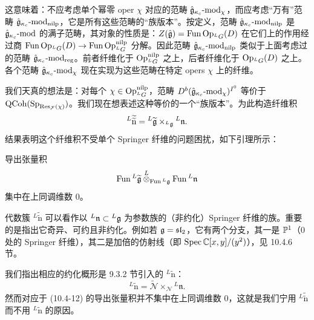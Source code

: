 这意味着：不应考虑单个幂零 oper $\chi$ 对应的范畴 $\hat{\mathfrak{g}}_{\kappa_c}\text{-}\mathrm{mod}_\chi$，而应考虑“万有”范畴 $\hat{\mathfrak{g}}_{\kappa_c}\text{-}\mathrm{mod}_{\mathrm{nilp}}$，它是所有这些范畴的“族版本”。按定义，范畴 $\hat{\mathfrak{g}}_{\kappa_c}\text{-}\mathrm{mod}_{\mathrm{nilp}}$ 是 $\hat{\mathfrak{g}}_{\kappa_c}\text{-}\mathrm{mod}$ 的满子范畴，其对象的性质是：$Z(\hat{\mathfrak{g}})=\operatorname{Fun}\operatorname{Op}_{{}^L G}(D)$ 在它们上的作用经过商 $\operatorname{Fun}\operatorname{Op}_{{}^L G}(D)\to\operatorname{Fun}\operatorname{Op}^{\mathrm{nilp}}_{{}^L G}$ 分解。因此范畴 $\hat{\mathfrak{g}}_{\kappa_c}\text{-}\mathrm{mod}_{\mathrm{nilp}}$ 类似于上面考虑过的范畴 $\hat{\mathfrak{g}}_{\kappa_c}\text{-}\mathrm{mod}_{\mathrm{reg}}$。前者纤维化于 $\operatorname{Op}^{\mathrm{nilp}}_{{}^L G}$ 之上，后者纤维化于 $\operatorname{Op}_{{}^L G}(D)$ 之上。各个范畴 $\hat{\mathfrak{g}}_{\kappa_c}\text{-}\mathrm{mod}_\chi$ 现在实现为这些范畴在特定 opers $\chi$ 上的纤维。

我们天真的想法是：对每个 $\chi\in\operatorname{Op}^{\mathrm{nilp}}_{{}^L G}$，范畴 $D^b(\hat{\mathfrak{g}}_{\kappa_c}\text{-}\mathrm{mod}_\chi)^{I^0}$ 等价于 $\mathrm{QCoh}(\operatorname{Sp}_{\operatorname{Res}_{\mathcal{F}}(\chi)})$。我们现在想表述这种等价的一个“族版本”。为此构造纤维积
\[
    {}^{L}\widetilde{\widetilde{\mathrm{n}}}
    ={}^{L}\widetilde{\mathfrak{g}}\times_{{}^L\mathfrak{g}}{}^L\mathfrak{n}.
\]
结果表明这个纤维积不受单个 Springer 纤维的问题困扰，如下引理所示：

\begin{lemma}\label{lem:u16-flat}
    导出张量积
    \[
        \operatorname{Fun}{}^L\widetilde{\mathfrak{g}}
        \overset{L}{\otimes}_{\operatorname{Fun}{}^L\mathfrak{g}}
        \operatorname{Fun}{}^L\mathfrak{n}
    \]
    集中在上同调维数 $0$。
\end{lemma}

代数簇 ${}^L\widetilde{\widetilde{\mathrm{n}}}$ 可以看作以 ${}^L\mathfrak{n}\subset{}^L\mathfrak{g}$ 为参数族的（非约化）Springer 纤维的族。重要的是指出它奇异、可约且非约化。例如若 $\mathfrak{g}=\mathfrak{sl}_2$，它有两个分支，其一是 $\mathbb{P}^1$（$0$ 处的 Springer 纤维），其二是加倍的仿射线（即 $\operatorname{Spec}\mathbb{C}[x,y]/(y^2)$），见 10.4.6 节。

我们指出相应的约化概形是 9.3.2 节引入的 ${}^L\widetilde{\mathrm{n}}$：
\begin{equation}
    {}^{L}\widetilde{\mathrm{n}}=\widetilde{\mathcal{N}}\times_{\mathcal{N}}{}^L\mathfrak{n}.
    \tag{10.4-12}
\end{equation}
然而对应于 (10.4-12) 的导出张量积并不集中在上同调维数 $0$，这就是我们宁用 ${}^L\widetilde{\widetilde{\mathrm{n}}}$ 而不用 ${}^L\widetilde{\mathrm{n}}$ 的原因。

